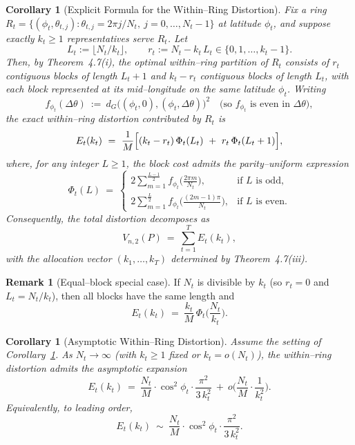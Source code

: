 \documentclass[12pt, reqno]{amsart}
\theoremstyle{plain}
\newtheorem{corollary}[subsection]{Corollary}
\theoremstyle{definition}
\newtheorem{remark}[subsection]{Remark}
\begin{document}
\begin{corollary}[Explicit Formula for the Within--Ring Distortion]\label{cor:within-ring-exact}
Fix a ring $R_t=\{(\phi_t,\theta_{t,j}) : \theta_{t,j}=2\pi j/N_t,\ j=0,\dots,N_t-1\}$ at latitude $\phi_t$,
and suppose exactly $k_t\ge 1$ representatives serve $R_t$. Let
\[
L_t := \big\lfloor N_t/k_t\big\rfloor,\qquad r_t := N_t - k_t\,L_t\in\{0,1,\dots,k_t-1\}.
\]
Then, by Theorem~4.7\textup{(i)}, the optimal within--ring partition of $R_t$ consists of $r_t$ contiguous
blocks of length $L_t\!+\!1$ and $k_t-r_t$ contiguous blocks of length $L_t$, with each block represented
at its mid--longitude on the same latitude $\phi_t$. Writing
\[
f_{\phi_t}(\Delta\theta)\ :=\ d_G\big((\phi_t,0),(\phi_t,\Delta\theta)\big)^2
\quad\text{(so }f_{\phi_t} \text{ is even in }\Delta\theta\text{)},
\]
the exact within--ring distortion contributed by $R_t$ is
\[
E_t(k_t)\ =\ \frac{1}{M}\Bigl[(k_t-r_t)\,\Phi_t(L_t)\ +\ r_t\,\Phi_t(L_t+1)\Bigr],
\]
where, for any integer $L\ge 1$, the block cost admits the parity--uniform expression
\[
\Phi_t(L)\ =\
\begin{cases}
\displaystyle 2\sum_{m=1}^{\frac{L-1}{2}}
 f_{\phi_t}\!\Big(\frac{2\pi m}{N_t}\Big),
& \text{if $L$ is odd},\\[1.25em]
\displaystyle 2\sum_{m=1}^{\frac{L}{2}}
 f_{\phi_t}\!\Big(\frac{(2m-1)\pi}{N_t}\Big),
& \text{if $L$ is even}.
\end{cases}
\]
Consequently, the total distortion decomposes as
\[
V_{n,2}(P)\ =\ \sum_{t=1}^{T} E_t(k_t),
\]
with the allocation vector $(k_1,\dots,k_T)$ determined by Theorem~4.7\textup{(iii)}.
\end{corollary}

\begin{remark}[Equal--block special case]
If $N_t$ is divisible by $k_t$ (so $r_t=0$ and $L_t=N_t/k_t$), then all blocks have the same length and
\[
E_t(k_t)\ =\ \frac{k_t}{M}\,\Phi_t\!\Big(\frac{N_t}{k_t}\Big).
\]
\end{remark}
\begin{corollary}[Asymptotic Within--Ring Distortion]\label{cor:within-ring-asymp}
Assume the setting of Corollary~\ref{cor:within-ring-exact}. As $N_t\to\infty$ (with $k_t\ge1$ fixed or $k_t=o(N_t)$),
the within--ring distortion admits the asymptotic expansion
\[
E_t(k_t)\ =\ \frac{N_t}{M}\cdot \cos^2\!\phi_t\cdot \frac{\pi^2}{3\,k_t^2}\ +\ o\!\Big(\frac{N_t}{M}\cdot\frac{1}{k_t^2}\Big).
\]
Equivalently, to leading order,
\[
E_t(k_t)\ \sim\ \frac{N_t}{M}\cdot \cos^2\!\phi_t\cdot \frac{\pi^2}{3\,k_t^2}.
\]
\end{corollary}
\end{document}
